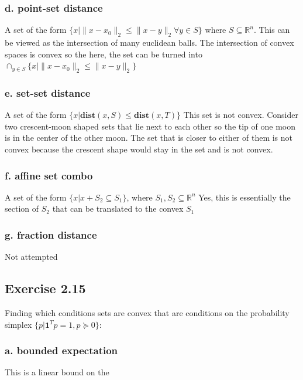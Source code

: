 \subsubsection{d. point-set distance}
A set of the form $\{ x |  \| x-x_0 \|_2 \leq \| x-y \|_2 \forall y \in S\}$ where $S \subseteq \mathbb{R}^n$. 
This can be viewed as the intersection of many euclidean balls. The intersection of convex spaces is convex so the here, the set can be turned into $\cap_{y \in S} \{ x |  \| x-x_0 \|_2 \leq \| x-y \|_2\}$
\subsubsection{e. set-set distance}
A set of the form $\{ x | \textbf{dist}(x,S) \leq  \textbf{dist}(x,T) \}$
This set is not convex. Consider two crescent-moon shaped sets that lie next to each other so the tip of one moon is in the center of the other moon. The set that is closer to either of them is not convex because the crescent shape would stay in the set and is not convex.

\subsubsection{f. affine set combo}
A set of the form $\{ x | x + S_2 \subseteq S_1 \}$, where $S_1, S_2 \subseteq \mathbb{R}^n$
Yes, this is essentially the section of $S_2$ that can be translated to the convex $S_1$

\subsubsection{g. fraction distance}
Not attempted


\subsection{Exercise 2.15}
Finding which conditions sets are convex that are conditions on the probability simplex $\{ p | \textbf{1}^T p = 1, p  \succeq 0 \}$:
\subsubsection{a. bounded expectation}
This is a linear bound on the 
